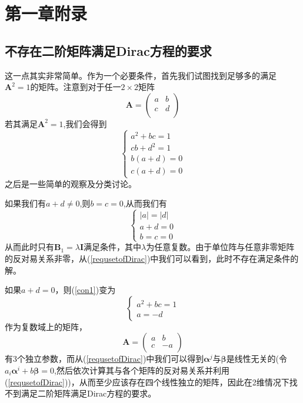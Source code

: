 \chapter*{第一章附录}
\section*{不存在二阶矩阵满足Dirac方程的要求}
这一点其实非常简单。作为一个必要条件，首先我们试图找到足够多的满足$\textbf{A}^{2}=1$的矩阵。注意到对于任一$2\times2$矩阵
\begin{equation}
\textbf{A}=
    \left(                 
  \begin{array}{cc}   
    a & b \\  
    c & d \\  
  \end{array}
\right)        
\end{equation}
若其满足$\textbf{A}^{2}=1$,我们会得到
\begin{equation}
\label{con1}
\left\{
        \begin{array}{llll}
            a^{2}+bc=1 \\
            cb+d^{2}=1 \\
            b(a+d)=0 \\
            c(a+d)=0
        \end{array}
    \right.
\end{equation}
之后是一些简单的观察及分类讨论。

如果我们有$a+d\neq0$,则$b=c=0$,从而我们有
\begin{equation}
\left\{
        \begin{array}{lll}
            |a|=|d|\\
            a+d=0 \\
            b=c=0
        \end{array}
    \right.
\end{equation}
从而此时只有$\textbf{B}_{1}=\lambda\textbf{I}$满足条件，其中$\lambda$为任意复数。由于单位阵与任意非零矩阵的反对易关系非零，从(\ref{requsetofDirac})中我们可以看到，此时不存在满足条件的解。

如果$a+d=0$，则(\ref{con1})变为
\begin{equation}
\left\{
        \begin{array}{ll}
            a^{2}+bc=1 \\
            a=-d
        \end{array}
    \right.
\end{equation}
作为复数域上的矩阵，
\begin{equation}
\textbf{A}=
    \left(                 
  \begin{array}{cc}   
    a & b \\  
    c & -a \\  
  \end{array}
\right)        
\end{equation}
有3个独立参数，而从(\ref{requsetofDirac})中我们可以得到$\pmb{\alpha}^{j}$与$\pmb{\beta}$是线性无关的(令$a_{i}\pmb{\alpha}^{i}+b\pmb{\beta}=0$,然后依次计算其与各个矩阵的反对易关系并利用(\ref{requsetofDirac}))，从而至少应该存在四个线性独立的矩阵，因此在2维情况下找不到满足二阶矩阵满足Dirac方程的要求。